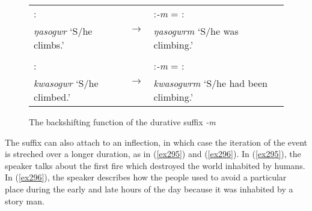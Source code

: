 \begin{figure}[h]
	\begin{tabularx}{.75\textwidth}{|l|l|l|}
		\cline{1-1} \cline{3-3}
		\Nonpast:\Ipfv &\multirow{2}{*}{$\rightarrow$}& \Nonpast:\Ipfv\emph{-m} = \Rpst:\Dur\\
		\emph{ŋasogwr} `S/he climbs.' && \emph{ŋasogwrm} `S/he was climbing.'\\
		\cline{1-1} \cline{3-3}
		\multicolumn{3}{c}{}\\
		\cline{1-1} \cline{3-3}
		\Rpst:\Ipfv &\multirow{2}{*}{$\rightarrow$}& \Rpst:\Ipfv\emph{-m} = \Pst:\Dur\\
		\emph{kwasogwr} `S/he climbed.' && \emph{kwasogwrm} `S/he had been climbing.'\\
		\cline{1-1} \cline{3-3}
	\end{tabularx}
\caption{The backshifting function of the durative suffix \emph{-m}}
\label{backshiftdur}
\end{figure}%

The  suffix can also attach to an  inflection, in which case the iteration of the event is streched over a longer duration, as in (\ref{ex295}) and (\ref{ex296}). In (\ref{ex295}), the speaker talks about the first fire which destroyed the world inhabited by humans. In (\ref{ex296}), the speaker describes how the people used to avoid a particular place during the early and late hours of the day because it was inhabited by a story man.

